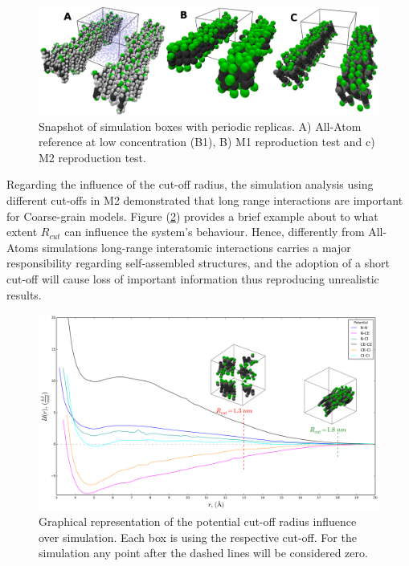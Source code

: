 \documentclass[10pt,a4paper,twoside]{article}
\begin{document}
   

     \begin{figure}[ht!]
  \begin{center}
	\includegraphics[width=1 \textwidth]{./images/M1M2box}
	\caption{Snapshot of simulation boxes with periodic replicas. A) All-Atom reference at low concentration (B1), B) M1 reproduction test and c) M2 reproduction test.}
	\label{Fig:M1M2box}
  \end{center}
\end{figure}

Regarding the influence of the cut-off radius, the simulation analysis using different cut-offs in M2 demonstrated that long range interactions are important for Coarse-grain models. Figure (\ref{Fig:M2cut}) provides a brief example about to what extent  $R_{cut}$ can influence the system's behaviour. Hence, differently from All-Atoms simulations long-range interatomic interactions carries a major responsibility regarding self-assembled structures, and the adoption of a short cut-off will cause loss of important information thus reproducing unrealistic results.

 \begin{figure}[H]
  \begin{center}
	\includegraphics[width=1 \textwidth]{./images/M2cut}
	\caption{Graphical representation of the potential cut-off radius influence over simulation. Each box is using the respective cut-off. For the simulation any point after the dashed lines will be considered zero. }
	\label{Fig:M2cut}
  \end{center}
\end{figure}
\end{document}
